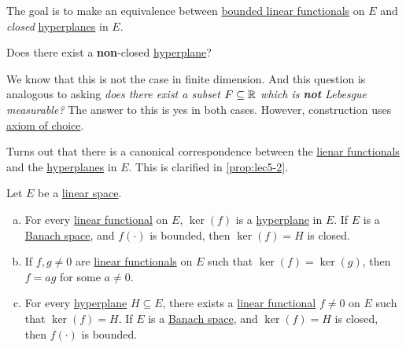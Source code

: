 The goal is to make an equivalence between \hyperref[def:bounded-linear-functional]{bounded linear functionals} on \(E\) and \emph{closed} \hyperref[def:hyperplane]{hyperplanes} in \(E\).

\begin{problem}
Does there exist a \textbf{non}-closed \hyperref[def:hyperplane]{hyperplane}?
\end{problem}
\begin{answer}
	We know that this is not the case in finite dimension. And this question is analogous to asking \emph{does there exist a subset \(F\subseteq \mathbb{\MakeUppercase{r}} \) which is \textbf{not} Lebesgue measurable?} The answer to this is yes in both cases. However, construction uses \href{https://en.wikipedia.org/wiki/Axiom_of_choice}{axiom of choice}.
\end{answer}

Turns out that there is a canonical correspondence between the \hyperref[def:linear-functional]{lienar functionals} and the \hyperref[def:hyperplane]{hyperplanes} in \(E\). This is clarified in \autoref{prop:lec5-2}.

\begin{proposition}\label{prop:lec5-2}
	Let \(E\) be a \hyperref[def:linear-vector-space]{linear space}.
	\begin{enumerate}[(a)]
		\item For every \hyperref[def:linear-functional]{linear functional} on \(E\), \(\ker(f)\) is a \hyperref[def:hyperplane]{hyperplane} in \(E\). If \(E\) is a \hyperref[def:Banach-space]{Banach space}, and \(f(\cdot)\) is bounded, then \(\ker(f) = H\) is closed.
		\item If \(f, g \neq 0\) are \hyperref[def:linear-functional]{linear functionals} on \(E\) such that \(\ker(f) = \ker(g)\), then \(f = ag\) for some \(a \neq 0\).
		\item For every \hyperref[def:hyperplane]{hyperplane} \(H\subseteq E\), there exists a \hyperref[def:linear-functional]{linear functional} \(f \neq 0\) on \(E\) such that \(\ker(f) = H\). If \(E\) is a \hyperref[def:Banach-space]{Banach space}, and \(\ker(f) = H\) is closed, then \(f(\cdot)\) is bounded.
	\end{enumerate}
\end{proposition}